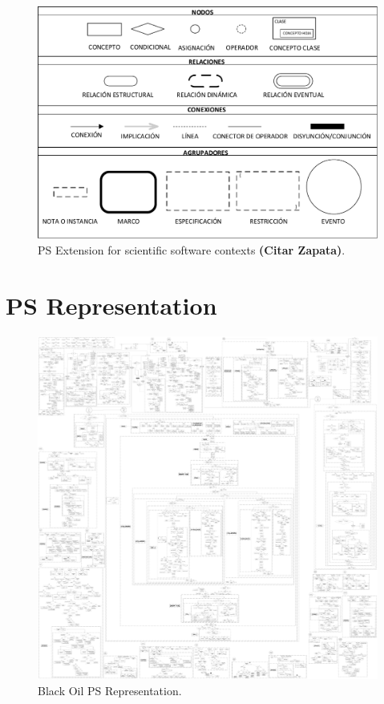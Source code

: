 \documentclass[review]{elsarticle}
\begin{document}
\begin{figure}
	\centering
	\includegraphics[width=1.0\textwidth]{Figures/PSElements.pdf}
	\caption{PS Extension for scientific software contexts {\color{red} \textbf{(Citar Zapata)}}.}
	\label{fig:PS_Extended}
\end{figure}



\section{PS Representation}
\begin{figure}
	\centering
	\includegraphics[width=1.0\textwidth]{Figures/Translated_PS.pdf}
	\caption{Black Oil PS Representation.}
	\label{fig:PS_Translated}
\end{figure}
\end{document}
